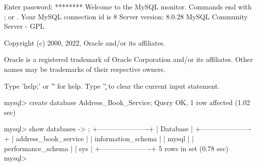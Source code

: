 
Enter password: ********
Welcome to the MySQL monitor.  Commands end with ; or \g.
Your MySQL connection id is 8
Server version: 8.0.28 MySQL Community Server - GPL

Copyright (c) 2000, 2022, Oracle and/or its affiliates.

Oracle is a registered trademark of Oracle Corporation and/or its
affiliates. Other names may be trademarks of their respective
owners.

Type 'help;' or '\h' for help. Type '\c' to clear the current input statement.

mysql> create database Address_Book_Service;
Query OK, 1 row affected (1.02 sec)

mysql> show databases
    -> ;
+----------------------+
| Database             |
+----------------------+
| address_book_service |
| information_schema   |
| mysql                |
| performance_schema   |
| sys                  |
+----------------------+
5 rows in set (0.78 sec)
mysql>
